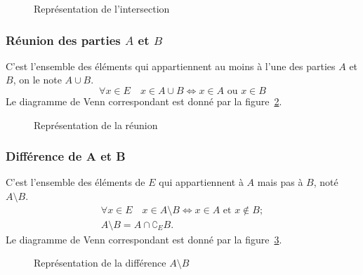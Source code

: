 \begin{figure}
\centering
{}
\caption{Représentation de l'intersection}
\label{chap3-fig:inter}
\end{figure}

\subsubsection{Réunion des parties $A$ et $B$}
\label{chap3-subsubsec:reunion}
C'est l'ensemble des éléments qui appartiennent au moins à l'une des parties $A$ et $B$, on le note $A \cup B$.
\begin{equation}
  \forall x \in E \quad x \in A \cup B \iff x \in A \text{~ou~} x \in B
\end{equation}
Le diagramme de Venn correspondant est donné par la figure~\ref{chap3-fig:reunion}.

\begin{figure}
\centering
{}
\caption{Représentation de la réunion}
\label{chap3-fig:reunion}
\end{figure}

\subsubsection{Différence de A et B}
\label{chap3-subsubsec:difference}
C'est l'ensemble des éléments de $E$ qui appartiennent à $A$ mais pas à $B$, noté $A \setminus B$.
\begin{gather}
  \forall x \in E \quad x \in A \setminus B \iff x \in A \text{~et~} x \not\in B; \\
  A \setminus B=A \cap \complement_E B.
\end{gather}
Le diagramme de Venn correspondant est donné par la figure~\ref{chap3-fig:diff}.

\begin{figure}
\centering
{}
\caption{Représentation de la différence $A \setminus B$}
\label{chap3-fig:diff}
\end{figure}

